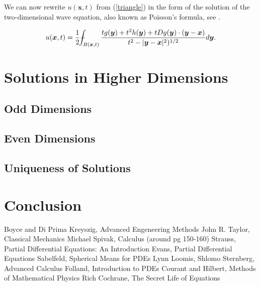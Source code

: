 \documentclass[a4paper, 12pt]{article}
\def\Xint#1{\mathchoice
{\XXint\displaystyle\textstyle{#1}}%
{\XXint\textstyle\scriptstyle{#1}}%
{\XXint\scriptstyle\scriptscriptstyle{#1}}%
{\XXint\scriptscriptstyle\scriptscriptstyle{#1}}%
\!\int}
\def\XXint#1#2#3{{\setbox0=\hbox{$#1{#2#3}{\int}$ }
\vcenter{\hbox{$#2#3$ }}\kern-.6\wd0}}
\def\dashint{\Xint-}
\numberwithin{equation}{section}
\begin{document}
We can now rewrite $u(\boldsymbol{x},t)$ from (\ref{triangle}) in the form of the solution of the two-dimensional wave equation, also known as Poisson's formula, see \cite{Ev}.
 
\begin{equation*}
    u(\boldsymbol{x},t)=\frac{1}{2}\dashint_{B(\boldsymbol{x},t)} \frac{tg(\boldsymbol{y})+t^2h(\boldsymbol{y})+tDg(\boldsymbol{y})\cdot (\boldsymbol{y}-\boldsymbol{x})}{t^2-|\boldsymbol{y}-\boldsymbol{x}|^2)^{1/2}}d\boldsymbol{y}.
\end{equation*}

\section{Solutions in Higher Dimensions}

\subsection{Odd Dimensions}
\subsection{Even Dimensions}
\subsection{Uniqueness of Solutions}

\section{Conclusion}

\begin{thebibliography}{alpha}
 Boyce and Di Prima 
 Kreyszig, Advanced Engeneering Methods
 John R. Taylor, Classical Mechanics
 Michael Spivak, Calculus (around pg 150-160)
 Strauss, Partial Differential Equations: An Introduction
 Evans, Partial Differential Equations
 Sabelfeld, Spherical Means for PDEs
 Lynn Loomis, Shlomo Sternberg, Advanced Calculus
 Folland, Introduction to PDEs
 Courant and Hilbert, Methods of Mathematical Physics
 Rich Cochrane, The Secret Life of Equations
\end{thebibliography} 
\end{document}
